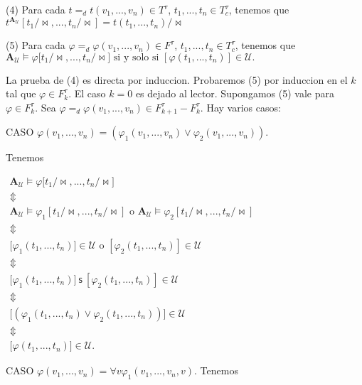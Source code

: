 (4) Para cada \(t=_{d}t(v_{1},...,v_{n})\in T^{\tau }\), \( t_{1},...,t_{n}\in T_{c}^{\tau }\), tenemos que
\(\displaystyle t^{\mathbf{A}_{\mathcal{U}}}[t_{1}/\mathrm{\bowtie },...,t_{n}/\mathrm{ \bowtie }]=t(t_{1},...,t_{n})/\mathrm{\bowtie } \)

(5) Para cada \(\varphi =_{d}\varphi (v_{1},...,v_{n})\in F^{\tau }\), \( t_{1},...,t_{n}\in T_{c}^{\tau }\), tenemos que
\(\displaystyle \mathbf{A}_{\mathcal{U}}\models \varphi \lbrack t_{1}/\mathrm{\bowtie } ,...,t_{n}/\mathrm{\bowtie }]\text{ si y solo si }[\varphi (t_{1},...,t_{n})]\in \mathcal{U}. \)

La prueba de (4) es directa por induccion. Probaremos (5) por induccion en el \(k\) tal que \(\varphi \in F_{k}^{\tau }\). El caso \(k=0\) es dejado al lector. Supongamos (5) vale para \(\varphi \in F_{k}^{\tau }\). Sea \(\varphi =_{d}\varphi (v_{1},...,v_{n})\in F_{k+1}^{\tau }-F_{k}^{\tau }.\) Hay varios casos:

CASO \(\varphi (v_{1},...,v_{n})=\left( \varphi _{1}(v_{1},...,v_{n})\vee \varphi _{2}(v_{1},...,v_{n})\right) .\)

Tenemos

\(\displaystyle \begin{array}{c} \mathbf{A}_{\mathcal{U}}\models \varphi \lbrack t_{1}/\mathrm{\bowtie } ,...,t_{n}/\mathrm{\bowtie }] \\ \Updownarrow \\ \mathbf{A}_{\mathcal{U}}\models \varphi _{1}[t_{1}/\mathrm{\bowtie } ,...,t_{n}/\mathrm{\bowtie }]\text{ o }\mathbf{A}_{\mathcal{U}}\models \varphi _{2}[t_{1}/\mathrm{\bowtie },...,t_{n}/\mathrm{\bowtie }] \\ \Updownarrow \\ \lbrack \varphi _{1}(t_{1},...,t_{n})]\in \mathcal{U}\text{ o }[\varphi _{2}(t_{1},...,t_{n})]\in \mathcal{U} \\ \Updownarrow \\ \lbrack \varphi _{1}(t_{1},...,t_{n})]\ \mathsf{s\ }[\varphi _{2}(t_{1},...,t_{n})]\in \mathcal{U} \\ \Updownarrow \\ \lbrack \left( \varphi _{1}(t_{1},...,t_{n})\vee \varphi _{2}(t_{1},...,t_{n})\right) ]\in \mathcal{U} \\ \Updownarrow \\ \lbrack \varphi (t_{1},...,t_{n})]\in \mathcal{U}. \end{array} \)

CASO \(\varphi (v_{1},...,v_{n})=\forall v\varphi _{1}(v_{1},...,v_{n},v).\)
Tenemos

